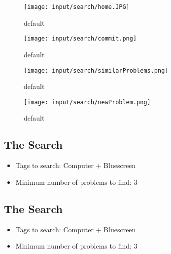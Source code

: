 \begin{frame}
\begin{figure}[htbp]
\begin{center}
\texttt{[image: input/search/home.JPG]}
\caption{default}
\label{default}
\end{center}
\end{figure}

\end{frame}

\begin{frame}

\begin{figure}[htbp]
\begin{center}
\texttt{[image: input/search/commit.png]}
\caption{default}
\label{default}
\end{center}
\end{figure}

\end{frame}

\begin{frame}

\begin{figure}[htbp]
\begin{center}
\texttt{[image: input/search/similarProblems.png]}
\caption{default}
\label{default}
\end{center}
\end{figure}

\end{frame}

\begin{frame}

\begin{figure}[htbp]
\begin{center}
\texttt{[image: input/search/newProblem.png]}
\caption{default}
\label{default}
\end{center}
\end{figure}

\end{frame}

\begin{frame}
\subsection{The Search}
\begin{itemize}
\item Tags to search: Computer + Bluescreen
\item Minimum number of problems to find: 3
\end{itemize}

\end{frame}



\begin{frame}
\subsection{The Search}
\begin{itemize}
\item Tags to search: Computer + Bluescreen
\item Minimum number of problems to find: 3
\end{itemize}

\end{frame}

